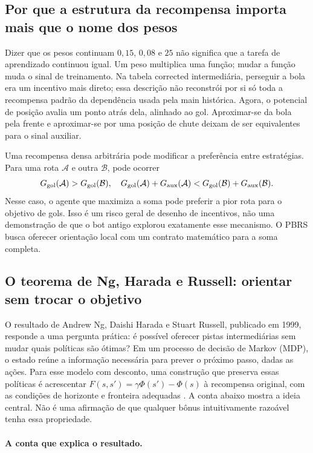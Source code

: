 \documentclass[11pt,a4paper]{article}
\begin{document}
\subsection{Por que a estrutura da recompensa importa mais que o nome dos pesos}
Dizer que os pesos continuam $0{,}15$, $0{,}08$ e $25$ não significa que a tarefa de aprendizado continuou igual. Um peso multiplica uma função; mudar a função muda o sinal de treinamento. Na tabela corrected intermediária, perseguir a bola era um incentivo mais direto; essa descrição não reconstrói por si só toda a recompensa padrão da dependência usada pela main histórica. Agora, o potencial de posição avalia um ponto atrás dela, alinhado ao gol. Aproximar-se da bola pela frente e aproximar-se por uma posição de chute deixam de ser equivalentes para o sinal auxiliar.

Uma recompensa densa arbitrária pode modificar a preferência entre estratégias. Para uma rota $\mathcal A$ e outra $\mathcal B$, pode ocorrer
\begin{equation}
 G_{\rm gol}(\mathcal A)>G_{\rm gol}(\mathcal B),\quad
 G_{\rm gol}(\mathcal A)+G_{\rm aux}(\mathcal A)
 <G_{\rm gol}(\mathcal B)+G_{\rm aux}(\mathcal B).
\end{equation}
Nesse caso, o agente que maximiza a soma pode preferir a pior rota para o objetivo de gols. Isso é um risco geral de desenho de incentivos, não uma demonstração de que o bot antigo explorou exatamente esse mecanismo. O PBRS busca oferecer orientação local com um contrato matemático para a soma completa.

\subsection{O teorema de Ng, Harada e Russell: orientar sem trocar o objetivo}
O resultado de Andrew Ng, Daishi Harada e Stuart Russell, publicado em 1999, responde a uma pergunta prática: é possível oferecer pistas intermediárias sem mudar quais políticas são ótimas? Em um processo de decisão de Markov (MDP), o estado reúne a informação necessária para prever o próximo passo, dadas as ações. Para esse modelo com desconto, uma construção que preserva essas políticas é acrescentar $F(s,s')=\gamma\Phi(s')-\Phi(s)$ à recompensa original, com as condições de horizonte e fronteira adequadas \cite{ng1999}. A conta abaixo mostra a ideia central. Não é uma afirmação de que qualquer bônus intuitivamente razoável tenha essa propriedade.

\paragraph{A conta que explica o resultado.}
\end{document}
